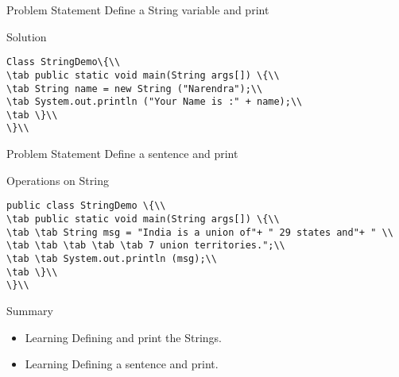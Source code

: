 \documentclass[aspectratio=169,14pt,usenames,dvipsnames]{beamer}
\newcommand\tab[1][1cm]{\hspace*{#1}}
\begin{document}
\begin{frame}{Problem Statement}
Define a String variable and print
\end{frame}


\begin{frame}{Solution}
\begin{lstlisting}
Class StringDemo\{\\
\tab public static void main(String args[]) \{\\
\tab String name = new String ("Narendra");\\
\tab System.out.println ("Your Name is :" + name);\\
\tab \}\\
\}\\
\end{lstlisting}
\end{frame}



\begin{frame}{Problem Statement}
Define a sentence and print
\end{frame}


\begin{frame}{Operations on String}
\begin{lstlisting}
public class StringDemo \{\\
\tab public static void main(String args[]) \{\\
\tab \tab String msg = "India is a union of"+ " 29 states and"+ " \\ \tab \tab \tab \tab \tab 7 union territories.";\\
\tab \tab System.out.println (msg);\\
\tab \}\\
\}\\
\end{lstlisting}
\end{frame}




\begin{frame}{Summary}
\begin{itemize}
    \item Learning Defining and print the Strings.
\item Learning Defining a sentence and print.
\end{itemize}
\end{frame}
\end{document}
